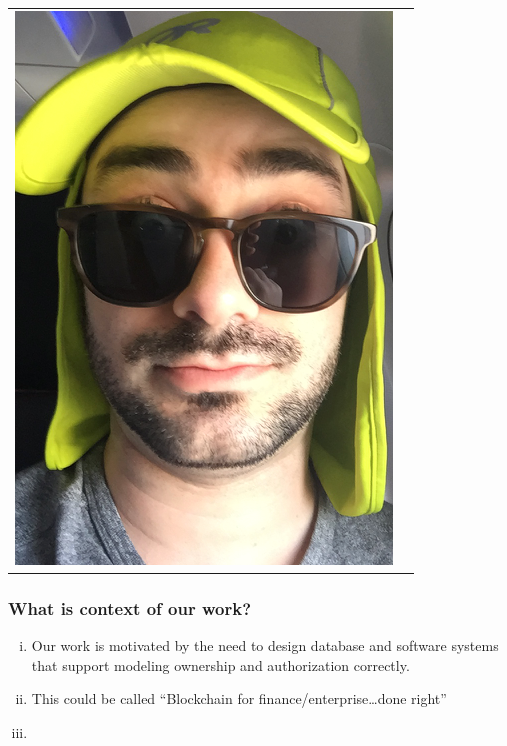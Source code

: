 \documentclass[11pt,reqno]{beamer}
\begin{document}
\begin{frame}
\begin{centering}
\begin{tabular}{l|r}
  \includegraphics[scale=0.22]{../joelpics/IMG_4133.png}
\end{tabular}
\end{centering}
\end{frame}

\begin{frame}\frametitle{What is context of our work?}
\begin{enumerate}[(i)]
  \item Our work is motivated by the need to design database and software systems
  that support modeling ownership and authorization correctly.
  \item This could be called ``Blockchain for finance/enterprise\ldots done right''
  \item
\end{enumerate}

\end{frame}






\end{document}
